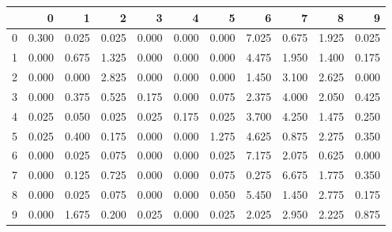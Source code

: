 % 
\begin{tabular}{r|rrrrrrrrrr}
 & 0 & 1 & 2 & 3 & 4 & 5 & 6 & 7 & 8 & 9 \\ 
  \hline
0 & 0.300 & 0.025 & 0.025 & 0.000 & 0.000 & 0.000 & 7.025 & 0.675 & 1.925 & 0.025 \\ 
  1 & 0.000 & 0.675 & 1.325 & 0.000 & 0.000 & 0.000 & 4.475 & 1.950 & 1.400 & 0.175 \\ 
  2 & 0.000 & 0.000 & 2.825 & 0.000 & 0.000 & 0.000 & 1.450 & 3.100 & 2.625 & 0.000 \\ 
  3 & 0.000 & 0.375 & 0.525 & 0.175 & 0.000 & 0.075 & 2.375 & 4.000 & 2.050 & 0.425 \\ 
  4 & 0.025 & 0.050 & 0.025 & 0.025 & 0.175 & 0.025 & 3.700 & 4.250 & 1.475 & 0.250 \\ 
  5 & 0.025 & 0.400 & 0.175 & 0.000 & 0.000 & 1.275 & 4.625 & 0.875 & 2.275 & 0.350 \\ 
  6 & 0.000 & 0.025 & 0.075 & 0.000 & 0.000 & 0.025 & 7.175 & 2.075 & 0.625 & 0.000 \\ 
  7 & 0.000 & 0.125 & 0.725 & 0.000 & 0.000 & 0.075 & 0.275 & 6.675 & 1.775 & 0.350 \\ 
  8 & 0.000 & 0.025 & 0.075 & 0.000 & 0.000 & 0.050 & 5.450 & 1.450 & 2.775 & 0.175 \\ 
  9 & 0.000 & 1.675 & 0.200 & 0.025 & 0.000 & 0.025 & 2.025 & 2.950 & 2.225 & 0.875 \\ 
\end{tabular}